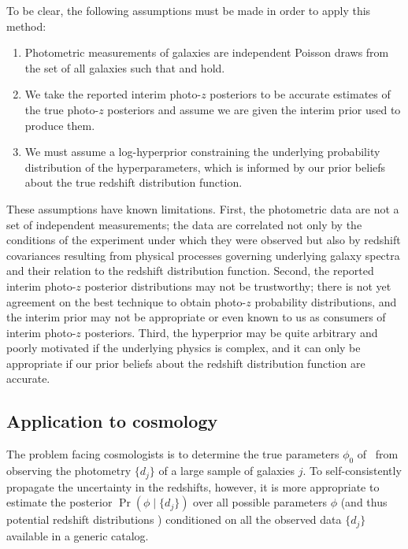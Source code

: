 To be clear, the following assumptions must be made in order to apply this method:

\begin{enumerate}
	\item Photometric measurements of galaxies are independent Poisson draws from the set of all galaxies such that  and  hold.
	\item We take the reported interim photo-$z$ posteriors to be accurate estimates of the true photo-$z$ posteriors and assume we are given the interim prior used to produce them.
	\item We must assume a log-hyperprior constraining the underlying probability distribution of the hyperparameters, which is informed by our prior beliefs about the true redshift distribution function.
\end{enumerate}

These assumptions have known limitations.  
First, the photometric data are not a set of independent measurements; the data are correlated not only by the conditions of the experiment under which they were observed but also by redshift covariances resulting from physical processes governing underlying galaxy spectra and their relation to the redshift distribution function.  
Second, the reported interim photo-$z$ posterior distributions may not be trustworthy; there is not yet agreement on the best technique to obtain photo-$z$ probability distributions, and the interim prior may not be appropriate or even known to us as consumers of interim photo-$z$ posteriors.  
Third, the hyperprior may be quite arbitrary and poorly motivated if the underlying physics is complex, and it can only be appropriate if our prior beliefs about the redshift distribution function are accurate.

\subsection{Application to cosmology}

The problem facing cosmologists is to determine the true parameters $\phi_{0}$ of \nz\ from observing the photometry $\{d_{j}\}$ of a large sample of galaxies $j$.
To self-consistently propagate the uncertainty in the redshifts, however, it is more appropriate to estimate the posterior $\Pr(\phi \mid \{d_{j}\})$ over all possible parameters $\phi$ (and thus potential redshift distributions \nz ) conditioned on all the observed data $\{d_{j}\}$ available in a generic catalog.

